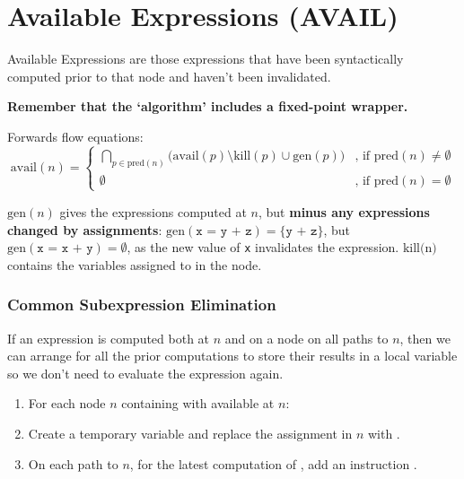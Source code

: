 \documentclass[a4paper, 11pt]{article}
\begin{document}
\section*{Available Expressions (AVAIL)}
{
    Available Expressions are those expressions that have been syntactically computed prior to that node and haven't been invalidated.

    \textbf{Remember that the `algorithm' includes a fixed-point wrapper.}

    Forwards flow equations:
    \begin{equation*}
    \text{avail}(n) =
    \begin{cases}
    \bigcap_{p \in \text{pred}(n)}{\big(\text{avail}(p) \setminus \text{kill}(p) \cup \text{gen}(p)\big)} &\text{, if pred}(n) \neq \emptyset \\
    \emptyset &\text{, if pred}(n) = \emptyset
    \end{cases}
    \end{equation*}

    \(\text{gen}(n)\) gives the expressions computed at \(n\), but \textbf{minus any expressions changed by assignments}: \(\text{gen}(\texttt{x = y + z}) = \{\texttt{y + z}\}\), but \(\text{gen}(\texttt{x = x + y}) = \emptyset\), as the new value of \texttt{x} invalidates the expression. \(\text{kill(n)}\) contains the variables assigned to in the node.

    \subsubsection*{Common Subexpression Elimination}
    {
        If an expression is computed both at \(n\) and on a node on all paths to \(n\), then we can arrange for all the prior computations to store their results in a local variable so we don't need to evaluate the expression again.

        \begin{enumerate}
        \item For each node \(n\) containing  with  available at \(n\):
        \item Create a temporary variable  and replace the assignment in \(n\) with .
        \item On each path to \(n\), for the latest computation of , add an instruction .
        \end{enumerate}

}}
\end{document}

